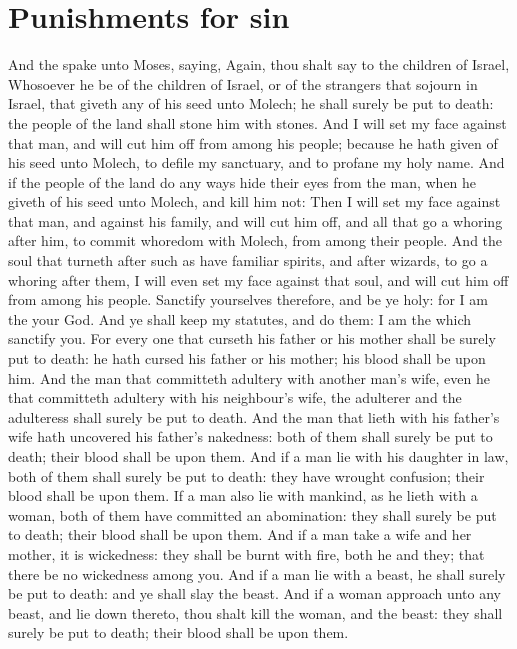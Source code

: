 \section*{Punishments for sin}
\begin{biblechapter} %
\verse And the \LORD spake unto Moses, saying,
\verse Again, thou shalt say to the children of Israel, Whosoever he be of the children of Israel, or of the strangers that sojourn in Israel, that giveth any of his seed unto Molech; he shall surely be put to death: the people of the land shall stone him with stones.
\verse And I will set my face against that man, and will cut him off from among his people; because he hath given of his seed unto Molech, to defile my sanctuary, and to profane my holy name.
\verse And if the people of the land do any ways hide their eyes from the man, when he giveth of his seed unto Molech, and kill him not:
\verse Then I will set my face against that man, and against his family, and will cut him off, and all that go a whoring after him, to commit whoredom with Molech, from among their people.
\verse And the soul that turneth after such as have familiar spirits, and after wizards, to go a whoring after them, I will even set my face against that soul, and will cut him off from among his people.
\verse Sanctify yourselves therefore, and be ye holy: for I am the \LORD your God.
\verse And ye shall keep my statutes, and do them: I am the \LORD which sanctify you.
\verse For every one that curseth his father or his mother shall be surely put to death: he hath cursed his father or his mother; his blood shall be upon him.
\verse And the man that committeth adultery with another man's wife, even he that committeth adultery with his neighbour's wife, the adulterer and the adulteress shall surely be put to death.
\verse And the man that lieth with his father's wife hath uncovered his father's nakedness: both of them shall surely be put to death; their blood shall be upon them.
\verse And if a man lie with his daughter in law, both of them shall surely be put to death: they have wrought confusion; their blood shall be upon them.
\verse If a man also lie with mankind, as he lieth with a woman, both of them have committed an abomination: they shall surely be put to death; their blood shall be upon them.
\verse And if a man take a wife and her mother, it is wickedness: they shall be burnt with fire, both he and they; that there be no wickedness among you.
\verse And if a man lie with a beast, he shall surely be put to death: and ye shall slay the beast.
\verse And if a woman approach unto any beast, and lie down thereto, thou shalt kill the woman, and the beast: they shall surely be put to death; their blood shall be upon them.

\end{biblechapter}
